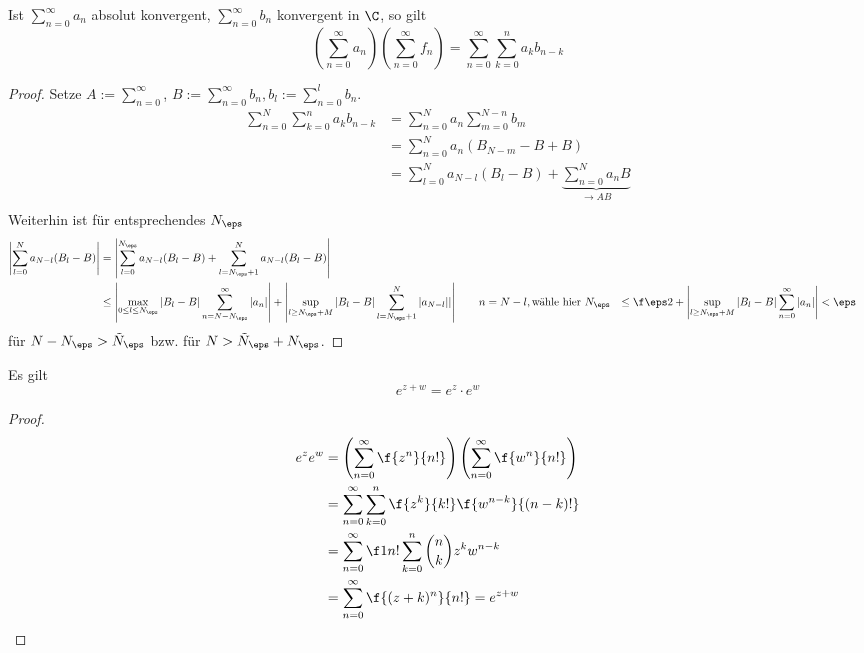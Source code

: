\documentclass[a4paper,10pt]{scrartcl}
\begin{document}
\begin{thm}
	\label{thm:1.18}
	Ist $\sum_{n=0}^\infty a_n$ absolut konvergent, $\sum_{n=0}^\infty b_n$ konvergent in $\C$, so gilt
	\[
		\left( \sum_{n=0}^\infty a_n\right) \left(\sum_{n=0}^\infty f_n\right) = \sum_{n=0}^\infty \sum_{k=0}^n a_k b_{n-k}
	\]
	\begin{proof}
		Setze $A:= \sum_{n=0}^\infty$, $B:= \sum_{n=0}^\infty b_n, b_l := \sum_{n=0}^l b_n$.
		\begin{align*}
			\sum_{n=0}^N \sum_{k=0}^n a_k b_{n-k}
				&= \sum_{n=0}^N a_n \sum_{m=0}^{N-n} b_m\\
				&= \sum_{n=0}^N a_n (B_{N-m}-B + B)\\
				&= \sum_{l=0}^N a_{N-l} (B_l -B) + \underbrace{\sum_{n=0}^N a_nB}_{\to AB}\\
		\end{align*}
		Weiterhin ist für entsprechendes $N_\eps$
		\begin{align*}
			\left|\sum_{l=0}^N a_{N-l} (B_l-B) \right|
				&= \left|\sum_{l=0}^{N_\eps} a_{N-l}(B_l-B) + \sum_{l=N_\eps +1}^N a_{N-l}(B_l-B)\right|\\
				&\le \left|\max_{0\le l \le N_\eps} |B_l-B|\sum_{n=N-N_\eps}^\infty |a_n| \right| +     \left|\sup_{l\ge N_{\eps}+M} |B_l-B| \sum_{l=N_\eps+1}^N |a_{N-l}| |\right| \qquad n= N-l, \text{wähle hier $N_\eps$}
				&\le \f \eps 2  +  \left|\sup_{l\ge N_{\eps}+M} |B_l-B| \sum_{n=0}^\infty |a_{n}| \right|
				&<     \eps
		\end{align*}
		für $N-N_\eps > \tilde N_\eps$ bzw. für  $N>\tilde N_\eps + N_\eps$.
	\end{proof}
\end{thm}

\begin{prop}
	\label{prop:1.19}
	Es gilt
	\[
		e^{z+w}  = e^z\cdot e^w
	\]
	\begin{proof}
		\begin{align*}
			e^ze^w &= \left(\sum_{n=0}^\infty \f{z^n}{n!}\right) \left( \sum_{n=0}^\infty \f {w^n}{n!}\right) \\
				&= \sum_{n=0}^\infty \sum_{k=0}^n \f {z^k}{k!} \f {w^{n-k}}{(n-k)!} \\
				&= \sum_{n=0}^\infty \f 1{n!} \sum_{k=0}^n \binom{n}{k}z^k w^{n-k} \\
				&= \sum_{n=0}^\infty \f {(z+k)^n}{n!} = e^{z+w}
		\end{align*}
	\end{proof}
\end{prop}
\end{document}
